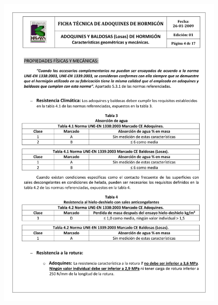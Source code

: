 \begin{figure}[!htb]
\centering
\includegraphics[scale=0.68]{ficha_tecnica/ft_adoquin_4.pdf}
\label{fig:ftadoquin4}
\end{figure}
\newpage
